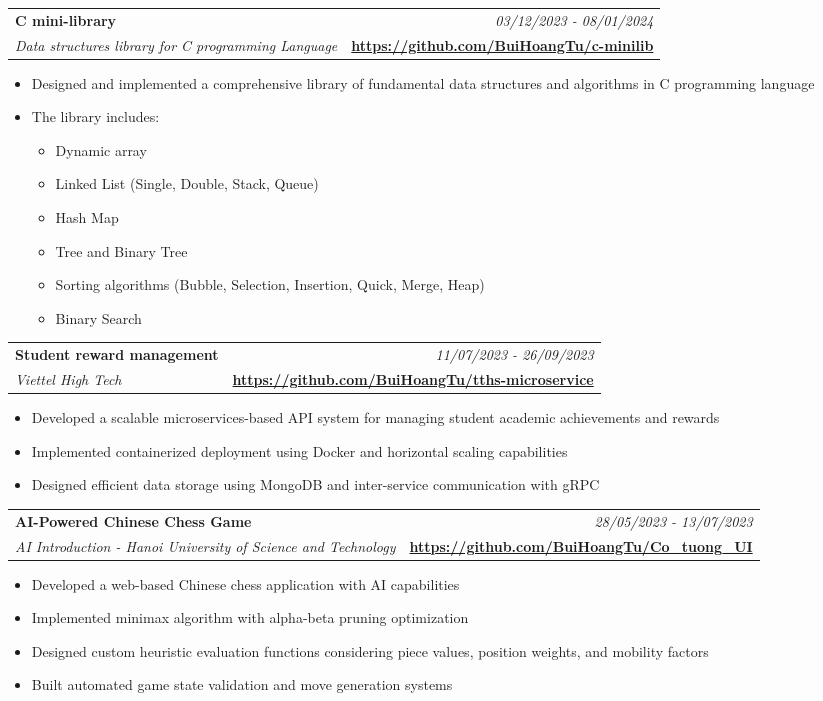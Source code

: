 \documentclass[a4paper,11pt]{article}
\makeatletter
\newcommand{\resumeProject}[4]{
\vspace{0.5mm}\item
    \begin{tabular*}{0.98\textwidth}[t]{l@{\extracolsep{\fill}}r}
        \textbf{#1} & \textit{\footnotesize{#3}} \\
        \footnotesize{\textit{#2}} & \footnotesize{#4}
    \end{tabular*}
    \vspace{-2.4mm}
}
\newcommand{\resumeItemListStart}{\begin{justify}\begin{itemize}[leftmargin=3ex, rightmargin=2ex, noitemsep,labelsep=1.2mm,itemsep=0mm]\small}
\newcommand{\resumeItemListEnd}{\end{itemize}\end{justify}\vspace{-2mm}}
\makeatother
\begin{document}
    \resumeProject
    {C mini-library}
    {Data structures library for C programming Language}
    {03/12/2023 - 08/01/2024} 
    {\href{https://github.com/BuiHoangTu/c-minilib}{\textbf{https://github.com/BuiHoangTu/c-minilib}}}
    \resumeItemListStart
        \item {Designed and implemented a comprehensive library of fundamental data structures and algorithms in C programming language}
        \item {The library includes:}
        \begin{itemize}
            \item {Dynamic array}
            \item {Linked List (Single, Double, Stack, Queue)}
            \item {Hash Map}
            \item {Tree and Binary Tree}
            \item {Sorting algorithms (Bubble, Selection, Insertion, Quick, Merge, Heap)}
            \item {Binary Search}
        \end{itemize}
    \resumeItemListEnd
    \vspace{-1mm}

    \resumeProject
    {Student reward management} %
    {Viettel High Tech} %
    {11/07/2023 - 26/09/2023} %
    {\href{https://github.com/BuiHoangTu/tths-microservice}{\textbf{https://github.com/BuiHoangTu/tths-microservice}}} %
    \resumeItemListStart
    	\item {Developed a scalable microservices-based API system for managing student academic achievements and rewards}
      	\item {Implemented containerized deployment using Docker and horizontal scaling capabilities}
      	\item {Designed efficient data storage using MongoDB and inter-service communication with gRPC}
    \resumeItemListEnd
    \vspace{-1mm}
    
    \resumeProject
    {AI-Powered Chinese Chess Game}
    {AI Introduction - Hanoi University of Science and Technology}
    {28/05/2023 - 13/07/2023} 
    {\href{https://github.com/BuiHoangTu/Co_tuong_UI}{\textbf{https://github.com/BuiHoangTu/Co\_tuong\_UI}}}
    \resumeItemListStart
    	\item {Developed a web-based Chinese chess application with AI capabilities}
    	\item {Implemented minimax algorithm with alpha-beta pruning optimization}
    	\item Designed custom heuristic evaluation functions considering piece values, position weights, and mobility factors
    	\item Built automated game state validation and move generation systems
    \resumeItemListEnd
    \vspace{-1mm}
\end{document}
